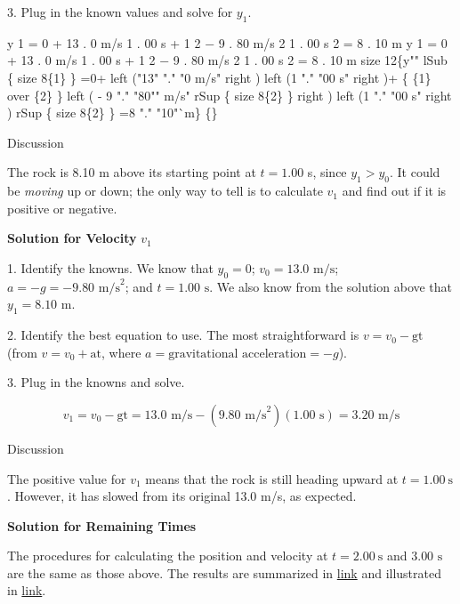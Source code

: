 \documentclass[
]{book}
\begin{document}
3. Plug in the known values and solve for \(y_{1}{}\).

\leavevmode{}%
{y 1 = 0 + 13 . 0 m/s 1 . 00 s + 1 2 − 9 . 80 m/s 2 1 . 00 s 2 = 8 . 10
m y 1 = 0 + 13 . 0 m/s 1 . 00 s + 1 2 − 9 . 80 m/s 2 1 . 00 s 2 = 8 . 10
m size 12\{y"" lSub \{ size 8\{1\} \} =0+ left ("13" "." "0 m/s"
right ) left (1 "." "00 s" right )+ \{ \{1\} over \{2\} \} left ( - 9
"." "80"" m/s" rSup \{ size 8\{2\} \} right ) left (1 "." "00 s"
right ) rSup \{ size 8\{2\} \} =8 "." "10"`m\} \{\}}

{Discussion}

The rock is 8.10 m above its starting point at
\({{t = 1}\text{.}\text{00}}{}\) s, since \({y_{1} > y_{0}}{}\). It could be
\emph{moving} up or down; the only way to tell is to calculate \(v_{1}{}\) and
find out if it is positive or negative.

\textbf{Solution for Velocity} \(v_{1}{}\)

1. Identify the knowns. We know that \({y_{0} = 0}{}\);
\({{v_{0} = \text{13}}\text{.}\text{0\ m/s}}{}\);
\({{{a = {- g}} = {- 9}}\text{.}\text{80\ m/s}^{2}}{}\); and
\({{t = 1}\text{.}\text{00\ s}}{}\). We also know from the solution above
that \({{y_{1} = 8}\text{.}\text{10\ m}}{}\).

2. Identify the best equation to use. The most straightforward is
\({v = {v_{0} - \text{gt}}}{}\) (from \({v = {v_{0} + \text{at}}}{}\), where
\({{a = \text{gravitational\ acceleration}} = {- g}}{}\)).

3. Plug in the knowns and solve.

\leavevmode{}%
\[{{{v_{1} = {v_{0} - \text{gt}}} = \text{13}}\text{.}{\text{0\ m/s} - \left( {9\text{.}\text{80\ m/s}^{2}} \right)}{\left( {1\text{.}\text{00\ s}} \right) = 3}\text{.}\text{20\ m/s}}{}\]

{Discussion}

The positive value for \(v_{1}{}\) means that the rock is still heading
upward at \({{t = 1}\text{.}\text{00}\ \text{s}}{}\). However, it has
slowed from its original 13.0\emph{} m/s, as
expected.

\textbf{Solution for Remaining Times}

The procedures for calculating the position and velocity at
\({{t = 2}\text{.}\text{00}\ \text{s}}{}\) and \({3\text{.}\text{00\ s}}{}\)
are the same as those above. The results are summarized in
\protect\hyperlink{eip-304}{link} and illustrated in
\protect\hyperlink{import-auto-id4064055}{link}.
\end{document}
